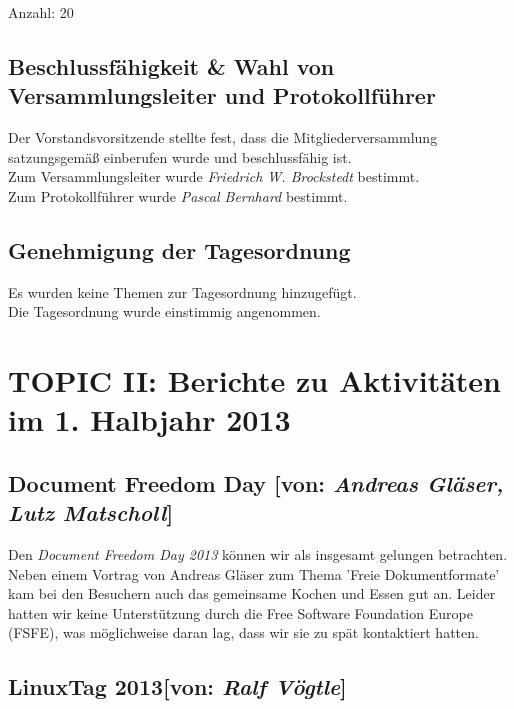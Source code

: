 \documentclass[11pt,a4paper,ngerman]{article}
\begin{document}
    Anzahl: 20

  \subsection{Beschlussfähigkeit \& Wahl von Versammlungsleiter und 
	      Protokollführer}

	      Der Vorstandsvorsitzende stellte fest, dass die 
	      Mitgliederversammlung satzungsgemäß einberufen wurde und 
	      beschlussfähig ist. \\
	      Zum Versammlungsleiter wurde \emph{Friedrich W. Brockstedt} 
	      bestimmt. \\
	      Zum Protokollführer wurde \emph{Pascal Bernhard} bestimmt.



  \subsection{Genehmigung der Tagesordnung}

	      Es wurden keine Themen zur Tagesordnung hinzugefügt. \\
	      Die Tagesordnung wurde einstimmig angenommen.

\newpage{}	  
	
	
\section{TOPIC II: Berichte zu Aktivitäten im 1. Halbjahr 2013}

  
  \subsection{Document Freedom Day [von: 
              \textcolor{hellgrau.60}{\textsl{Andreas Gläser, Lutz Matscholl}}]}

              
Den \textsl{Document Freedom Day 2013} können wir als insgesamt 
gelungen betrachten. Neben einem Vortrag von Andreas Gläser zum Thema 'Freie 
Dokumentformate' kam bei den Besuchern auch das gemeinsame Kochen und Essen gut 
an. Leider hatten wir keine Unterstützung durch die Free Software Foundation 
Europe (FSFE), was möglichweise daran lag, dass wir sie zu spät kontaktiert 
hatten.



  \subsection{LinuxTag 2013[von:          
	      \textcolor{hellgrau.60}{\textsl{Ralf Vögtle}}]} 
  
  
\newpage{}


\newpage{}
\end{document}
